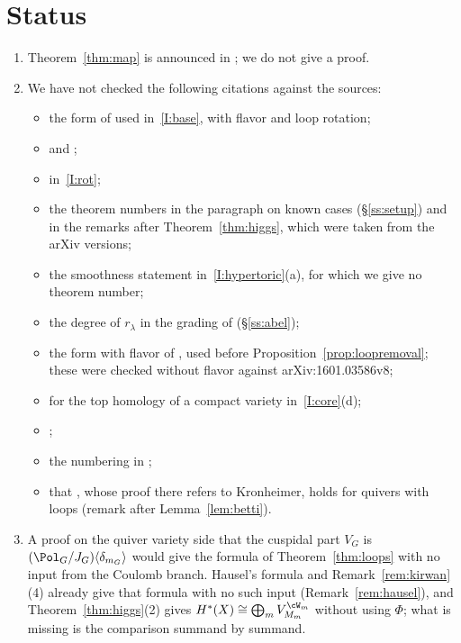\documentclass[11pt]{amsart}
\begin{document}
\section{Status}\label{sec:status}
\begin{enumerate}[leftmargin=2em]
\item Theorem~\ref{thm:map} is announced in \cite[Thm.~E]{bottaQuasimapCritical2026}; we do
not give a proof.
\item We have not checked the following citations against the sources:
\begin{itemize}[leftmargin=1.5em]
\item the form of \cite[Prop.~3.22]{BFN} used in~\ref{I:base}, with
flavor and loop rotation;
\item \cite{hauselCohomologyLarge2013} and \cite{greeneInterpretationWhitney1983};
\item \cite[Prop.~3.18]{bellamySymplecticResolutions2021} in~\ref{I:rot};
\item the theorem numbers in the paragraph on known cases (\S\ref{ss:setup}) and
in the remarks after Theorem~\ref{thm:higgs}, which were taken from the arXiv
versions;
\item the smoothness statement in~\ref{I:hypertoric}(a), for which we give
no theorem number;
\item the degree of $r_\lambda$ in the grading of \cite{BFN}
(\S\ref{ss:abel});
\item the form with flavor of \cite[Thm.~4.1, Lemma~5.17,
Prop.~6.6]{BFN}, used before Proposition~\ref{prop:loopremoval}; these
were checked without flavor against arXiv:1601.03586v8;
\item \cite[\S2.6]{CG97} for the top homology of a compact variety
in~\ref{I:core}(d);
\item \cite[Prop.~3.7.5]{kashiwaraSheavesManifolds1994};
\item the numbering in \cite{BBD};
\item that \cite[Thm.~4.1(2)]{nakajimaInstantonsALE1994}, whose proof there
refers to Kronheimer, holds for quivers with loops (remark after
Lemma~\ref{lem:betti}).
\end{itemize}
\item A proof on the quiver variety side that the cuspidal part $V_G$ is
$(\Pol_G/J_G)\langle\delta_{m_G}\rangle$ would give the formula of
Theorem~\ref{thm:loops} with no input from the Coulomb branch.  Hausel's
formula and Remark~\ref{rem:kirwan}(4) already give that formula with no such
input (Remark~\ref{rem:hausel}), and Theorem~\ref{thm:higgs}(2) gives
$H^*(X)\cong\bigoplus_mV_{M_m}^{\cW_m}$ without using $\Phi$; what is missing is
the comparison summand by summand.
\end{enumerate}

{\renewcommand{\markboth}[2]{}\printbibliography}
\end{document}
